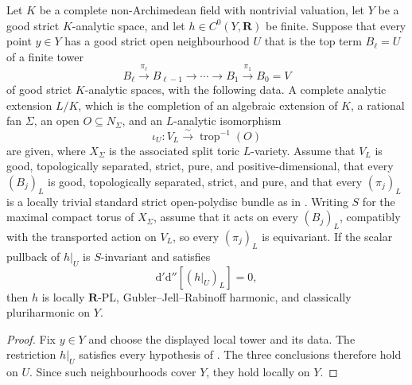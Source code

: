 \begin{corollary}
\label{cor:p062-local-iterated-algebraic-split-invariant-toric-open-polydisc-bundles}
Let \(K\) be a complete non-Archimedean field with nontrivial valuation, let
\(Y\) be a good strict \(K\)-analytic space, and let
\(h\in C^0(Y,\mathbf R)\) be finite.  Suppose that every point \(y\in Y\)
has a good strict open neighbourhood \(U\) that is the top term
\(B_\ell=U\) of a finite tower
\[
 B_\ell\xrightarrow{\pi_\ell}B_{\ell-1}
 \longrightarrow\cdots\longrightarrow B_1
 \xrightarrow{\pi_1}B_0=V
\]
of good strict \(K\)-analytic spaces, with the following data.  A complete
analytic extension \(L/K\), which is the completion of an algebraic
extension of \(K\), a rational fan \(\Sigma\), an open
\(O\subseteq N_\Sigma\), and an \(L\)-analytic isomorphism
\[
             \iota_U:V_L\xrightarrow{\sim}\operatorname{trop}^{-1}(O)
\]
are given, where \(X_\Sigma\) is the associated split toric \(L\)-variety.
Assume that \(V_L\) is good, topologically separated, strict, pure, and
positive-dimensional, that every \((B_j)_L\) is good, topologically
separated, strict, and pure, and that every
\((\pi_j)_L\) is a locally trivial standard strict open-polydisc bundle as
in .  Writing \(S\) for the
maximal compact torus of \(X_\Sigma\), assume that it acts on every
\((B_j)_L\), compatibly with the transported action on \(V_L\), so every
\((\pi_j)_L\) is equivariant.  If the scalar pullback of \(h|_U\) is
\(S\)-invariant and satisfies
\[
                 \mathrm d'\mathrm d''[(h|_U)_L]=0,
\]
then \(h\) is locally \(\mathbf R\)-PL, Gubler--Jell--Rabinoff harmonic,
and classically pluriharmonic on \(Y\).
\end{corollary}

\begin{proof}
Fix \(y\in Y\) and choose the displayed local tower and its data.  The
restriction \(h|_U\) satisfies every hypothesis of
.
The three conclusions therefore hold on \(U\).  Since such neighbourhoods
cover \(Y\), they hold locally on \(Y\).
\end{proof}

